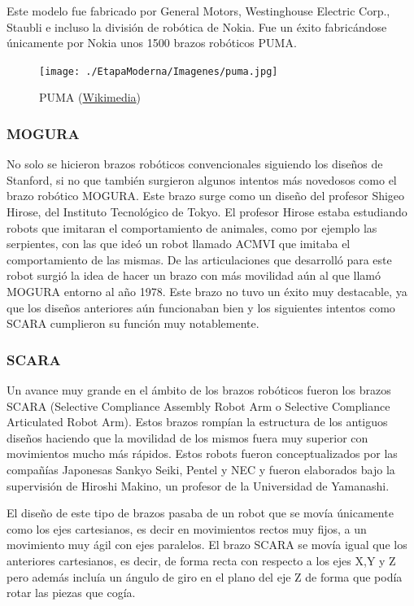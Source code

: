 Este modelo fue fabricado por General Motors, Westinghouse Electric Corp., Staubli e incluso la división de robótica de Nokia. Fue un éxito fabricándose únicamente por Nokia unos 1500 brazos robóticos PUMA.

\begin{figure}[!h]
	\centering
	\texttt{[image: ./EtapaModerna/Imagenes/puma.jpg]}
	\caption{PUMA (\href{https://es.m.wikipedia.org/wiki/Archivo:Puma_Robotic_Arm_-_GPN-2000-001817.jpg}{Wikimedia})}
	\label{fig:puma}
\end{figure}

\subsubsection{MOGURA}

No solo se hicieron brazos robóticos convencionales siguiendo los diseños de Stanford, si no que también surgieron algunos intentos más novedosos como el brazo robótico MOGURA. Este brazo surge como un diseño del profesor Shigeo Hirose, del Instituto Tecnológico de Tokyo. El profesor Hirose estaba estudiando robots que imitaran el comportamiento de animales, como por ejemplo las serpientes, con las que ideó un robot llamado ACMVI que imitaba el comportamiento de las mismas. De las articulaciones que desarrolló para este robot surgió la idea de hacer un brazo con más movilidad aún al que llamó MOGURA entorno al año 1978. Este brazo no tuvo un éxito muy destacable, ya que los diseños anteriores aún funcionaban bien y los siguientes intentos como SCARA cumplieron su función muy notablemente.

\subsubsection{SCARA}
Un avance muy grande en el ámbito de los brazos robóticos fueron los brazos SCARA (Selective Compliance Assembly Robot Arm o Selective Compliance Articulated Robot Arm). Estos brazos rompían la estructura de los antiguos diseños haciendo que la movilidad de los mismos fuera muy superior con movimientos mucho más rápidos. Estos robots fueron conceptualizados por las compañías Japonesas Sankyo Seiki, Pentel y NEC y fueron elaborados bajo la supervisión de Hiroshi Makino, un profesor de la Universidad de Yamanashi.

El diseño de este tipo de brazos pasaba de un robot que se movía únicamente como los ejes cartesianos, es decir en movimientos rectos muy fijos, a un movimiento muy ágil con ejes paralelos. El brazo SCARA se movía igual que los anteriores cartesianos, es decir, de forma recta con respecto a los ejes X,Y y Z pero además incluía un ángulo de giro en el plano del eje Z de forma que podía rotar las piezas que cogía.

